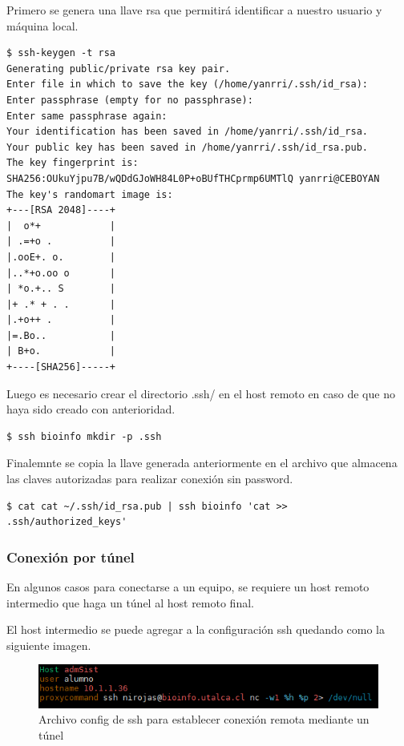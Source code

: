 \documentclass[12pt]{article}
\begin{document}
Primero se genera una llave rsa que permitirá identificar a nuestro usuario y máquina local.

\begin{lstlisting}[frame=single]
$ ssh-keygen -t rsa
Generating public/private rsa key pair.
Enter file in which to save the key (/home/yanrri/.ssh/id_rsa): 
Enter passphrase (empty for no passphrase): 
Enter same passphrase again: 
Your identification has been saved in /home/yanrri/.ssh/id_rsa.
Your public key has been saved in /home/yanrri/.ssh/id_rsa.pub.
The key fingerprint is:
SHA256:OUkuYjpu7B/wQDdGJoWH84L0P+oBUfTHCprmp6UMTlQ yanrri@CEBOYAN
The key's randomart image is:
+---[RSA 2048]----+
|  o*+            |
| .=+o .          |
|.ooE+. o.        |
|..*+o.oo o       |
| *o.+.. S        |
|+ .* + . .       |
|.+o++ .          |
|=.Bo..           |
| B+o.            |
+----[SHA256]-----+
\end{lstlisting}
  
Luego es necesario crear el directorio .ssh/ en el host remoto en caso de que no haya sido creado con anterioridad.

\begin{lstlisting}[frame=single]
$ ssh bioinfo mkdir -p .ssh
\end{lstlisting}


Finalemnte se copia la llave generada anteriormente en el archivo que almacena las claves autorizadas para realizar conexión sin password. 
\begin{lstlisting}[frame=single]
$ cat cat ~/.ssh/id_rsa.pub | ssh bioinfo 'cat >> .ssh/authorized_keys'
\end{lstlisting}

\subsubsection{Conexión por túnel}

En algunos casos para conectarse a un equipo, se requiere un host remoto intermedio que haga un túnel al host remoto final.

El host intermedio se puede agregar a la configuración ssh quedando como la siguiente imagen. 

\begin{figure}[!h]
   \centering
   \includegraphics[scale=.82]{imgs/proxy_config.PNG}
   \caption{Archivo config de ssh para establecer conexión remota mediante un túnel}
   \label{fig6}
\end{figure}
\end{document}
